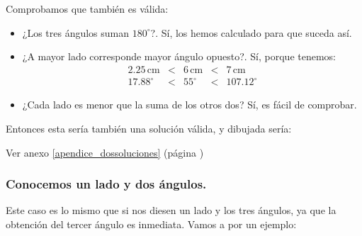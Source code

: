 \documentclass[a4paper,11pt,answers]{exam}
\newcommand{\degree}{^\circ}
\newcommand\unidad[1]{\,\text{#1}}
\begin{document}
\begin{solution}
\begin{itemize}
    Comprobamos que también es válida:
    \begin{itemize}
    \item ¿Los tres ángulos suman $180\degree$?. Sí, los hemos calculado para que suceda así.
    \item ¿A mayor lado corresponde mayor ángulo opuesto?. Sí, porque tenemos:
      \[
        \begin{array}{rcrcr}
          2.25\unidad{cm}&<&6\unidad{cm}&<&7\unidad{cm}\\
          17.88\degree&<&55\degree&<&107.12\degree
        \end{array}
      \]
    \item ¿Cada lado es menor que la suma de los otros dos? Sí, es fácil de comprobar.
    \end{itemize}
    Entonces esta sería también una solución válida, y dibujada sería:
    \begin{center}
  \end{center}
  \end{itemize}
  Ver anexo \ref{apendice_dossoluciones} (página \pageref{apendice_dossoluciones})
\end{solution}

\subsubsection{Conocemos un lado y dos ángulos.}
Este caso es lo mismo que si nos diesen un lado y los tres ángulos,
ya que la obtención del tercer ángulo es inmediata.
Vamos a por un ejemplo:\\
\end{document}
